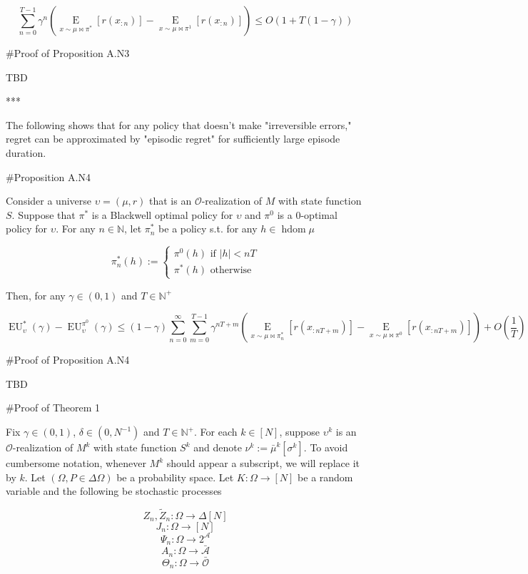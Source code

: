 \documentclass[a4paper]{article}
\newcommand{\Comment}[1]{}
\newcommand{\E}[1]{\underset{#1}{\operatorname{E}}}
\newcommand{\Nats}{\mathbb{N}}
\newcommand{\Abs}[1]{\lvert #1 \rvert}
\newcommand{\Ob}{\mathcal{O}}
\newcommand{\A}{\mathcal{A}}
\newcommand{\Ado}{\bar{\Ob}}
\newcommand{\Ada}{\bar{\A}}
\DeclareMathOperator{\HD}{hdom}
\newcommand{\EU}{\operatorname{EU}}
\newcommand{\F}{\mathcal{F}}
\newcommand{\Z}{Z}
\newcommand{\J}{J}
\begin{document}
$$\sum_{n=0}^{T-1} \gamma^n \left(\E{x \sim \mu\bowtie\pi^*}\left[r\left(x_{:n}\right)\right]-\E{x \sim \mu\bowtie\pi^1}\left[r\left(x_{:n}\right)\right]\right) \leq O\left(1+T\left(1-\gamma\right)\right)$$

\#Proof of Proposition A.N3

TBD

***

The following shows that for any policy that doesn't make "irreversible errors," regret can be approximated by "episodic regret" for sufficiently large episode duration.

\#Proposition A.N4

Consider a universe $\upsilon=(\mu,r)$ that is an $\Ob$-realization of $M$ with state function $S$. Suppose that $\pi^*$ is a Blackwell optimal policy for $\upsilon$ and $\pi^0$ is a $0$-optimal policy for $\upsilon$. For any $n \in \Nats$, let $\pi^*_n$ be a policy s.t. for any $h \in \HD{\mu}$

$$\pi^*_n(h):=\begin{cases} \pi^0(h) \text{ if } \Abs{h} < nT \\ \pi^*(h) \text{ otherwise} \end{cases}$$

Then, for any $\gamma\in(0,1)$ and $T \in \Nats^+$

$$\EU^*_\upsilon(\gamma)-\EU^{\pi^0}_\upsilon(\gamma) \leq (1-\gamma)\sum_{n=0}^\infty \sum_{m=0}^{T-1} \gamma^{nT+m}\left(\E{x\sim\mu\bowtie\pi^*_n}\left[r\left(x_{:nT+m}\right)\right]-\E{x\sim\mu\bowtie\pi^0}\left[r\left(x_{:nT+m}\right)\right]\right) + O\left(\frac{1}{T}\right)$$

\#Proof of Proposition A.N4

TBD

\#Proof of Theorem 1

Fix $\gamma \in (0,1)$, $\delta\in\left(0,N^{-1}\right)$ and $T \in \Nats^+$. For each $k \in [N]$, suppose $\upsilon^k$ is an $\Ob$-realization of $M^k$ with state function $S^k$ and denote $\nu^k:=\bar{\mu}^k\left[\sigma^k\right]$. To avoid cumbersome notation, whenever $M^k$ should appear a subscript, we will replace it by $k$. Let $(\Omega,P \in \Delta\Omega)$ be a probability space\Comment{ and $\{\F_n \subseteq 2^\Omega\}_{n \in \Nats \sqcup \{-1\}}$ a filtration of $\Omega$}. Let $K: \Omega \rightarrow [N]$ be \Comment{measurable w.r.t. $\F_{-1}$}a random variable and the following be stochastic processes\Comment{ adapted to $\F$}

$$\Z_n,\tilde{\Z}_n: \Omega \rightarrow \Delta[N]$$
%
$$\J_n: \Omega \rightarrow [N]$$
%
$$\Psi_n: \Omega \rightarrow 2^\A$$
%
$$A_n: \Omega \rightarrow \Ada$$
%
$$\Theta_n: \Omega \rightarrow \Ado$$
\end{document}
